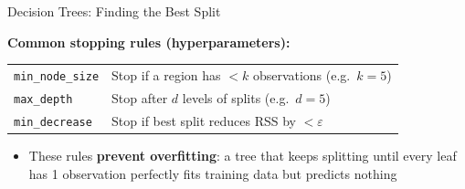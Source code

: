 \documentclass[hyperref={pdfpagelabels=false}]{beamer}
\begin{document}
\begin{frame}{Decision Trees: Finding the Best Split}

\textbf{Common stopping rules (hyperparameters):}
\vspace{0.1cm}

\begin{tabular}{ll}
\texttt{min\_node\_size} & Stop if a region has $<k$ observations (e.g.\ $k=5$) \\[3pt]
\texttt{max\_depth}      & Stop after $d$ levels of splits (e.g.\ $d=5$) \\[3pt]
\texttt{min\_decrease}   & Stop if best split reduces RSS by $<\varepsilon$ \\
\end{tabular}

\vspace{0.15cm}
\begin{itemize}
  \item These rules \textbf{prevent overfitting}: a tree that keeps splitting until every leaf has 1 observation perfectly fits training data but predicts nothing
\end{itemize}
\end{frame}
\end{document}
